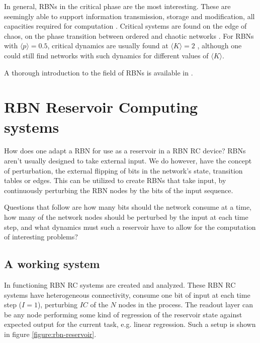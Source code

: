 In general, RBNs in the critical phase are the most interesting.
These are seemingly able to support information transmission, storage and modification,
all capacities required for computation \cite{langton3computation}.
Critical systems are found on the edge of chaos,
on the phase transition between ordered and chaotic networks \cite{gershenson2004introduction}.
For RBNs with $\langle p \rangle = 0.5$,
critical dynamics are usually found at $\langle K \rangle = 2$ \cite{gershenson2004introduction},
although one could still find networks with such dynamics for different values of $\langle K \rangle$.

A thorough introduction to the field of RBNs is available in \cite{gershenson2004introduction}.

\section{RBN Reservoir Computing systems}
\label{subsection:rbn-reservoir-systems}

How does one adapt a RBN for use as a reservoir in a RBN RC device?
RBNs aren't usually designed to take external input.
We do however, have the concept of perturbation,
the external flipping of bits in the network's state,
transition tables or edges.
This can be utilized to create RBNs that take input,
by continuously perturbing the RBN nodes by the bits of the input sequence.

Questions that follow are how many bits should the network consume at a time,
how many of the network nodes should be perturbed by the input at each time step,
and what dynamics must such a reservoir have to allow for the computation of interesting problems?

\subsection{A working system}

In \cite{rbn-reservoir} functioning RBN RC systems are created and analyzed.
These RBN RC systems have heterogeneous connectivity,
consume one bit of input at each time step ($I=1$),
perturbing $IC$ of the $N$ nodes in the process.
The readout layer can be any node performing some kind of regression of the reservoir state against expected output for the current task, e.g. linear regression.
Such a setup is shown in figure \ref{figure:rbn-reservoir}.

